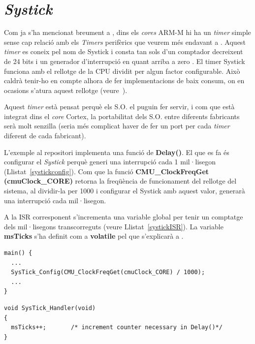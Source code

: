 \section{{\em Systick}}
\label{sec:systick}
Com ja s'ha mencionat breument a , dins els {\em cores} ARM-M hi ha un {\em timer} simple sense cap relació amb els {\em Timers} perifèrics que veurem més endavant a . Aquest {\em timer} es coneix pel nom de \gls{Systick} i consta tan sols d'un comptador decreixent de 24 bits i un generador d'interrupció en quant arriba a zero \cite[312]{GuideCortexM3M4}. El timer Systick funciona amb el rellotge de la CPU dividit per algun factor configurable. Això caldrà tenir-ho en compte alhora de fer implementacions de baix consum, on en ocasions s'atura aquest rellotge (veure~).

Aquest {\em timer} està pensat perquè els S.O. el puguin fer servir, i com que està integrat dins el {\em core} Cortex, la portabilitat dels S.O. entre diferents fabricants serà molt senzilla (seria més complicat haver de fer un port per cada {\em timer} diferent de cada fabricant).

L'exemple al repositori implementa una funció de {\bf Delay()}. El que es fa és configurar el {\em Systick} perquè generi una interrupció cada 1 mil·lisegon (Llistat~\ref{systickconfig}). Com que la funció {\bf CMU\_ClockFreqGet\\(cmuClock\_CORE)} retorna la freqüència de funcionament del rellotge del sistema, al dividir-la per 1000 i configurar el Systick amb aquest valor, generarà una interrupció cada mil·lisegon.

A la ISR corresponent s'incrementa una variable global per tenir un comptatge dels mil·lisegons transcorreguts (veure Llistat~\ref{systickISR}). La variable {\bf msTicks} s'ha definit com a {\bf volatile} pel que s'explicarà a .

\begin{lstlisting}[caption={Configuració del {\em Systick}},style=customc,label=systickconfig]
main() {
  ...
  SysTick_Config(CMU_ClockFreqGet(cmuClock_CORE) / 1000);
  ...
}
\end{lstlisting}

\begin{lstlisting}[caption={ISR del {\em Systick}},style=customc,label=systickISR]
void SysTick_Handler(void)
{
  msTicks++;       /* increment counter necessary in Delay()*/
}
\end{lstlisting}

